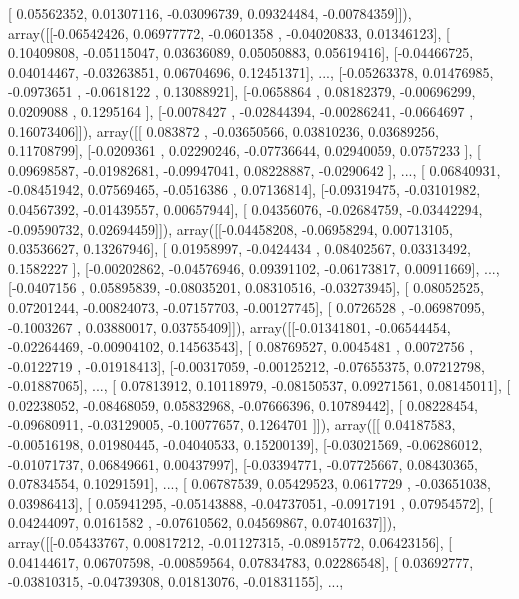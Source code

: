 \documentclass{article}
\begin{document}
       [ 0.05562352,  0.01307116, -0.03096739,  0.09324484, -0.00784359]]), array([[-0.06542426,  0.06977772, -0.0601358 , -0.04020833,  0.01346123],
       [ 0.10409808, -0.05115047,  0.03636089,  0.05050883,  0.05619416],
       [-0.04466725,  0.04014467, -0.03263851,  0.06704696,  0.12451371],
       ..., 
       [-0.05263378,  0.01476985, -0.0973651 , -0.0618122 ,  0.13088921],
       [-0.0658864 ,  0.08182379, -0.00696299,  0.0209088 ,  0.1295164 ],
       [-0.0078427 , -0.02844394, -0.00286241, -0.0664697 ,  0.16073406]]), array([[ 0.083872  , -0.03650566,  0.03810236,  0.03689256,  0.11708799],
       [-0.0209361 ,  0.02290246, -0.07736644,  0.02940059,  0.0757233 ],
       [ 0.09698587, -0.01982681, -0.09947041,  0.08228887, -0.0290642 ],
       ..., 
       [ 0.06840931, -0.08451942,  0.07569465, -0.0516386 ,  0.07136814],
       [-0.09319475, -0.03101982,  0.04567392, -0.01439557,  0.00657944],
       [ 0.04356076, -0.02684759, -0.03442294, -0.09590732,  0.02694459]]), array([[-0.04458208, -0.06958294,  0.00713105,  0.03536627,  0.13267946],
       [ 0.01958997, -0.0424434 ,  0.08402567,  0.03313492,  0.1582227 ],
       [-0.00202862, -0.04576946,  0.09391102, -0.06173817,  0.00911669],
       ..., 
       [-0.0407156 ,  0.05895839, -0.08035201,  0.08310516, -0.03273945],
       [ 0.08052525,  0.07201244, -0.00824073, -0.07157703, -0.00127745],
       [ 0.0726528 , -0.06987095, -0.1003267 ,  0.03880017,  0.03755409]]), array([[-0.01341801, -0.06544454, -0.02264469, -0.00904102,  0.14563543],
       [ 0.08769527,  0.0045481 ,  0.0072756 , -0.0122719 , -0.01918413],
       [-0.00317059, -0.00125212, -0.07655375,  0.07212798, -0.01887065],
       ..., 
       [ 0.07813912,  0.10118979, -0.08150537,  0.09271561,  0.08145011],
       [ 0.02238052, -0.08468059,  0.05832968, -0.07666396,  0.10789442],
       [ 0.08228454, -0.09680911, -0.03129005, -0.10077657,  0.1264701 ]]), array([[ 0.04187583, -0.00516198,  0.01980445, -0.04040533,  0.15200139],
       [-0.03021569, -0.06286012, -0.01071737,  0.06849661,  0.00437997],
       [-0.03394771, -0.07725667,  0.08430365,  0.07834554,  0.10291591],
       ..., 
       [ 0.06787539,  0.05429523,  0.0617729 , -0.03651038,  0.03986413],
       [ 0.05941295, -0.05143888, -0.04737051, -0.0917191 ,  0.07954572],
       [ 0.04244097,  0.0161582 , -0.07610562,  0.04569867,  0.07401637]]), array([[-0.05433767,  0.00817212, -0.01127315, -0.08915772,  0.06423156],
       [ 0.04144617,  0.06707598, -0.00859564,  0.07834783,  0.02286548],
       [ 0.03692777, -0.03810315, -0.04739308,  0.01813076, -0.01831155],
       ..., 
\end{document}
